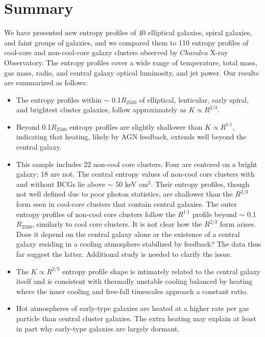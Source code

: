 \documentclass[apjl]{emulateapj}
\begin{document}
\section{Summary}
We have presented new entropy profiles of 40 elliptical galaxies, spiral galaxies, and faint groups of galaxies, and we compared them to 110 entropy profiles of cool-core and non-cool-core galaxy clusters observed by $Chandra$ X-ray Observatory. The entropy profiles cover a wide range of temperature, total mass, gas mass, radio, and central galaxy optical luminosity, and jet power. Our results are summarized as follows:
\begin{itemize}
\item The entropy profiles within $\sim$ 0.1$R_{2500}$ of elliptical, lenticular, early spiral, and brightest cluster galaxies, follow approximately as $K \propto R^{2/3}$.
\item Beyond 0.1$R_{2500}$  entropy profiles are slightly shallower than $K \propto R^{1.1}$, indicating that heating, likely by AGN feedback, extends well beyond the central galaxy. 
\item {This sample includes 22 non-cool core clusters. Four are centered on a bright galaxy; 18 are not. The central entropy values of non-cool core clusters with and without BCGs lie above $\sim$ 50 keV cm$^2$. Their entropy profiles, though not well defined due to poor photon statistics, are shallower than the  $R^{2/3}$ form seen in cool-core clusters that contain central galaxies. The outer entropy profiles of non-cool core clusters follow the $R^{1.1}$ profile beyond $\sim$ 0.1$R_{2500}$, similarly to cool core clusters.  It is not clear how the $R^{2/3}$ form arises. Does it depend on the central galaxy alone or the existence of a central galaxy residing in a cooling atmosphere stabilized by feedback? The data thus far suggest the latter. Additional study is needed to clarify the issue. 
}
\item The $K \propto R^{2/3}$ entropy profile shape is intimately related to the central galaxy itself and is consistent with thermally unstable cooling balanced by heating where the inner cooling and free-fall timescales approach a constant ratio.
\item Hot atmospheres of early-type galaxies are heated at a higher rate per gas particle than
central cluster galaxies. The extra heating may explain at least in part why early-type galaxies are largely dormant.
\end{itemize}
\end{document}
